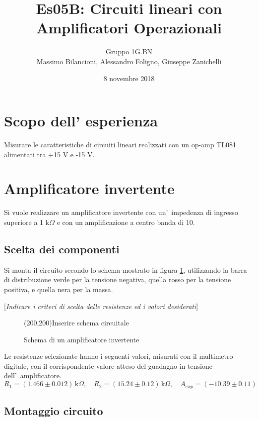 \documentclass[10pt,a4paper]{article}
\author{Gruppo 1G.BN \\ Massimo Bilancioni, Alessandro Foligno, Giuseppe Zanichelli }
\title{Es05B: Circuiti lineari con Amplificatori Operazionali}
\newcommand{\rem}[1]{[\emph{#1}]}
\begin{document}
	\date{8 novembre 2018}
	\maketitle
	
	
	\section*{Scopo dell' esperienza}
	Misurare le caratteristiche di circuiti lineari realizzati con un op-amp TL081 alimentati tra +15 V e -15 V.
	
	\section{Amplificatore invertente}
	Si vuole realizzare un amplificatore invertente con un'~impedenza di ingresso superiore a 1 
	k$\Omega$ e con un amplificazione a centro banda di 10.
	
	\subsection{Scelta dei componenti}
	
	Si monta il circuito secondo lo schema mostrato in figura \ref{fig:ampinv}, utilizzando la barra di 
	distribuzione verde per la tensione negativa, quella rosso per la tensione positiva, e quella nera per 
	la massa.
	
	\rem{Indicare i criteri di scelta delle resistenze ed i valori desiderati}
	\begin{figure}[h]
		\begin{center}
			\framebox(200,200){Inserire schema circuitale}
			\caption{\small Schema di un amplificatore invertente}
			\label{fig:ampinv}
		\end{center}
	\end{figure}
	
	Le resistenze selezionate hanno i seguenti valori, misurati con il multimetro digitale, con il corrispondente valore atteso 
	del guadagno in tensione dell'~amplificatore.
	\[
	R_1 = ( 1.466 \pm 0.012) \,\mathrm{k}\Omega, \quad 
	R_2 = (15.24  \pm 0.12) \,\mathrm{k}\Omega, \quad 
	A_{exp} = ( -10.39 \pm 0.11)
	\]
	
	\subsection{Montaggio circuito}
	
\end{document}
